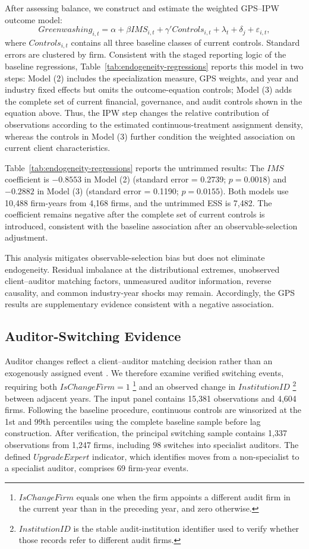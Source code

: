 \documentclass[11pt]{article}
\begin{document}
After assessing balance, we construct and estimate the weighted GPS--IPW outcome model:
\[
Greenwashing_{i,t}=\alpha+\beta IMS_{i,t}+\gamma'Controls_{i,t}
+\lambda_t+\delta_j+\varepsilon_{i,t},
\]
where \(Controls_{i,t}\) contains all three baseline classes of current controls. Standard errors are clustered by firm. 
Consistent with the staged reporting logic of the baseline regressions, Table~\ref{tab:endogeneity-regressions} reports this model in two steps: 
Model (2) includes the specialization measure, GPS weights, and year and industry fixed effects but omits the outcome-equation controls; 
Model (3) adds the complete set of current financial, governance, and audit controls shown in the equation above. 
Thus, the IPW step changes the relative contribution of observations according to the estimated continuous-treatment assignment density, whereas the controls in Model (3) further condition the weighted association on current client characteristics.

Table~\ref{tab:endogeneity-regressions} reports the untrimmed results: 
The \(IMS\) coefficient is \(-0.8553\) in Model (2) (standard error = 0.2739; \(p=0.0018\)) and \(-0.2882\) in Model (3) (standard error = 0.1190; \(p=0.0155\)). 
Both models use 10,488 firm-years from 4,168 firms, and the untrimmed ESS is 7,482. 
The coefficient remains negative after the complete set of current controls is introduced, consistent with the baseline association after an observable-selection adjustment. 

This analysis mitigates observable-selection bias but does not eliminate endogeneity. 
Residual imbalance at the distributional extremes, unobserved client--auditor matching factors, unmeasured auditor information, reverse causality, and common industry-year shocks may remain. 
Accordingly, the GPS results are supplementary evidence consistent with a negative association.


\subsection{Auditor-Switching Evidence}

Auditor changes reflect a client--auditor matching decision rather than an exogenously assigned event \citep{defondsubramanyam1998}. 
We therefore examine verified switching events, requiring both \(IsChangeFirm=1\) \footnote{\(IsChangeFirm\) equals one when the firm appoints a different audit firm in the current year than in the preceding year, and zero otherwise. } and an observed change in \(InstitutionID\) \footnote{\(InstitutionID\) is the stable audit-institution identifier used to verify whether those records refer to different audit firms.} between adjacent years. 
The input panel contains 15,381 observations and 4,604 firms. Following the baseline procedure, continuous controls are winsorized at the 1st and 99th percentiles using the complete baseline sample before lag construction. After verification, the principal switching sample contains 1,337 observations from 1,247 firms, including 98 switches into specialist auditors. The defined \(UpgradeExpert\) indicator, which identifies moves from a non-specialist to a specialist auditor, comprises 69 firm-year events.
\end{document}
